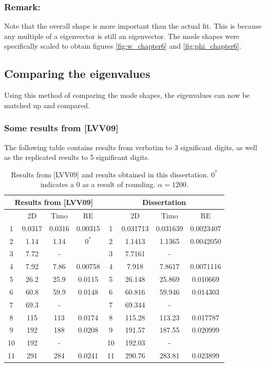 \documentclass[../../main.tex]{subfiles}
\begin{document}
\subsubsection{Remark:} Note that the overall shape is more important than the actual fit. This is because any multiple of a eigenvector is still an eigenvector. The mode shapes were specifically scaled to obtain figures \ref{fig:w_chapter6} and \ref{fig:phi_chapter6}.

\subsection{Comparing the eigenvalues}
Using this method of comparing the mode shapes, the eigenvalues can now be matched up and compared.

\subsubsection{Some results from [LVV09]}
The following table contains results from \cite{LVV09} verbatim to 3 significant digits, as well as the replicated results to 5 significant digits.

\begin{table}[!ht]
	\centering
	\caption{Results from [LVV09] and results obtained in this dissertation. $0^*$ indicates a 0 as a result of rounding. $\alpha = 1200$.}
	\begin{tabular}{|c|c|c|c||c|c|c|c|}
		\hline
		\multicolumn{4}{|c||}{Results from [LVV09]} & \multicolumn{4}{c|}{Dissertation} \\ \hline \hline
		~ & 2D & Timo & RE & ~ & 2D & Timo & RE  \\ \hline
		1 & 0.0317 & 0.0316 & 0.00315 & 1 & 0.031713 & 0.031639 & 0.0023407  \\ 
		2 & 1.14 & 1.14 & $0^*$ & 2 & 1.1413 & 1.1365 &  0.0042050 \\ 
		3 & 7.72 & - & ~ & 3 & 7.7161 & - &   \\ 
		4 & 7.92 & 7.86 & 0.00758 & 4 & 7.918 & 7.8617 & 0.0071116    \\ 
		5 & 26.2 & 25.9 & 0.0115 & 5 & 26.148 & 25.869 & 0.010669  \\ 
		6 & 60.8 & 59.9 & 0.0148 & 6 & 60.816 & 59.946 & 0.014303  \\ 
		7 & 69.3 & - & ~ & 7 & 69.344 & - &    \\ 
		8 & 115 & 113 & 0.0174 & 8 & 115.28 & 113.23 &  0.017787  \\ 
		9 & 192 & 188 & 0.0208 & 9 & 191.57 & 187.55 &  0.020999  \\ 
		10 & 192 & - &  & 10 & 192.03 & - &   \\ 
		11 & 291 & 284 & 0.0241 & 11 & 290.76 & 283.81 &  0.023899  \\ \hline
	\end{tabular}\label{Results_LVV09_chapter6}
\end{table}
\end{document}
